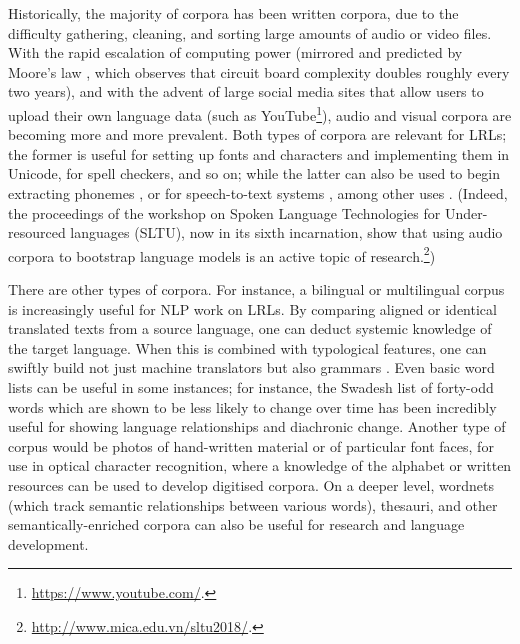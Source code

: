 Historically, the majority of corpora has been written corpora, due to the difficulty gathering, cleaning, and sorting large amounts of audio or video files. With the rapid escalation of computing power (mirrored and predicted by Moore's law \citep{schaller1997moore}, which observes that circuit board complexity doubles roughly every two years), and with the advent of large social media sites that allow users to upload their own language data (such as YouTube\footnote{\href{https://www.youtube.com/}{https://www.youtube.com/}. }), audio and visual corpora are becoming more and more prevalent. Both types of corpora are relevant for LRLs; the former is useful for setting up fonts and characters and implementing them in Unicode, for spell checkers, and so on; while the latter can also be used to begin extracting phonemes \citep{kempton2014discovering, muller2017improving}, or for speech-to-text systems \citep{fraga2015active, fraga2015improving}, among other uses \citep{adams2017automatic}. (Indeed, the proceedings of the workshop on Spoken Language Technologies for Under-resourced languages (SLTU), now in its sixth incarnation, show that using audio corpora to bootstrap language models is an active topic of research.\footnote{\href{http://www.mica.edu.vn/sltu2018/}{http://www.mica.edu.vn/sltu2018/}. })

There are other types of corpora. For instance, a bilingual or multilingual corpus is increasingly useful for NLP work on LRLs. By comparing aligned or identical translated texts from a source language, one can deduct systemic knowledge of the target language. When this is combined with typological features, one can swiftly build not just machine translators \citep{lewis2010haitian} but also grammars \citep{bender2016linguistic}. Even basic word lists can be useful in some instances; for instance, the Swadesh list of forty-odd words which are shown to be less likely to change over time \citep{swadesh1955towards} has been incredibly useful for showing language relationships and diachronic change. Another type of corpus would be photos of hand-written material or of particular font faces, for use in optical character recognition, where a knowledge of the alphabet or written resources can be used to develop digitised corpora. On a deeper level, wordnets (which track semantic relationships between various words), thesauri, and other semantically-enriched corpora can also be useful for research and language development.

